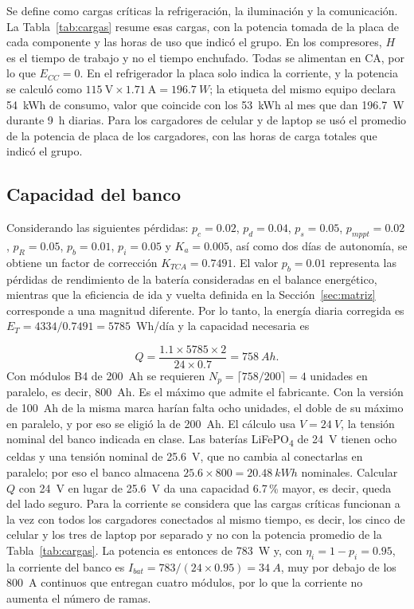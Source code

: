 Se define como cargas críticas la refrigeración, la iluminación y la comunicación. La Tabla~\ref{tab:cargas} resume esas cargas, con la potencia tomada de la placa de cada componente y las horas de uso que indicó el grupo. En los compresores, $H$ es el tiempo de trabajo y no el tiempo enchufado. Todas se alimentan en CA, por lo que $E_{CC} = 0$. En el refrigerador la placa solo indica la corriente, y la potencia se calculó como $115~\text{V} \times 1.71~\text{A} = \SI{196.7}{W}$; la etiqueta del mismo equipo declara 54~kWh de consumo, valor que coincide con los \SI{53}{kWh} al mes que dan \SI{196.7}{W} durante \SI{9}{h} diarias. Para los cargadores de celular y de laptop se usó el promedio de la potencia de placa de los cargadores, con las horas de carga totales que indicó el grupo.

\subsection{Capacidad del banco}

Considerando las siguientes pérdidas: $p_c = 0.02$, $p_d = 0.04$, $p_s = 0.05$, $p_{mppt} = 0.02$, $p_R = 0.05$, $p_b = 0.01$, $p_i = 0.05$ y $K_a = 0.005$, así como dos días de autonomía, se obtiene un factor de corrección $K_{TCA} = 0.7491$. El valor $p_b = 0.01$ representa las pérdidas de rendimiento de la batería consideradas en el balance energético, mientras que la eficiencia de ida y vuelta definida en la Sección~\ref{sec:matriz} corresponde a una magnitud diferente. Por lo tanto, la energía diaria corregida es $E_T = 4334/0.7491 = 5785$~Wh/día y la capacidad necesaria es

\begin{equation}
Q = \frac{1.1 \times 5785 \times 2}{24 \times 0.7} = \SI{758}{Ah}.
\end{equation}
Con módulos B4 de \SI{200}{Ah} se requieren $N_p = \lceil 758/200 \rceil = 4$ unidades en paralelo, es decir, \SI{800}{Ah}. Es el máximo que admite el fabricante. Con la versión de \SI{100}{Ah} de la misma marca harían falta ocho unidades, el doble de su máximo en paralelo, y por eso se eligió la de \SI{200}{Ah}. El cálculo usa $V = \SI{24}{V}$, la tensión nominal del banco indicada en clase. Las baterías LiFePO\textsubscript{4} de \SI{24}{V} tienen ocho celdas y una tensión nominal de \SI{25.6}{V}, que no cambia al conectarlas en paralelo; por eso el banco almacena $25.6 \times 800 = \SI{20.48}{kWh}$ nominales. Calcular $Q$ con \SI{24}{V} en lugar de \SI{25.6}{V} da una capacidad 6.7\,\% mayor, es decir, queda del lado seguro. Para la corriente se considera que las cargas críticas funcionan a la vez con todos los cargadores conectados al mismo tiempo, es decir, los cinco de celular y los tres de laptop por separado y no con la potencia promedio de la Tabla~\ref{tab:cargas}. La potencia es entonces de \SI{783}{W} y, con $\eta_i = 1 - p_i = 0.95$, la corriente del banco es $I_{bat} = 783/(24 \times 0.95) = \SI{34}{A}$, muy por debajo de los \SI{800}{A} continuos que entregan cuatro módulos, por lo que la corriente no aumenta el número de ramas.

